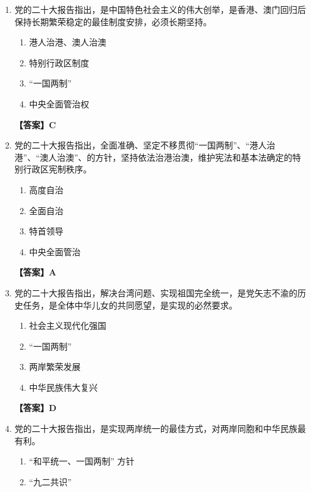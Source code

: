 \documentclass[UTF8,11pt,a4paper]{ctexart}
\begin{document}
\begin{enumerate}[label=\textbf{\arabic*.}, leftmargin=2.5em, itemsep=0.7em]
\begin{enumerate}[label=\Alph*., leftmargin=2em, itemsep=0.1em, topsep=0.15em]
\item 人民军队的组织体系
\end{enumerate}
\textbf{【答案】B}
\item 党的二十大报告指出，\allowbreak\underline{\hspace{4em}}是中国特色社会主义的伟大创举，是香港、澳门回归后保持长期繁荣稳定的最佳制度安排，必须长期坚持。
\begin{enumerate}[label=\Alph*., leftmargin=2em, itemsep=0.1em, topsep=0.15em]
\item 港人治港、澳人治澳
\item 特别行政区制度
\item “一国两制”
\item 中央全面管治权
\end{enumerate}
\textbf{【答案】C}
\item 党的二十大报告指出，全面准确、坚定不移贯彻“一国两制”、“港人治港”、“澳人治澳”、\allowbreak\underline{\hspace{4em}}的方针，坚持依法治港治澳，维护宪法和基本法确定的特别行政区宪制秩序。
\begin{enumerate}[label=\Alph*., leftmargin=2em, itemsep=0.1em, topsep=0.15em]
\item 高度自治
\item 全面自治
\item 特首领导
\item 中央全面管治
\end{enumerate}
\textbf{【答案】A}
\item 党的二十大报告指出，解决台湾问题、实现祖国完全统一，是党矢志不渝的历史任务，是全体中华儿女的共同愿望，是实现\allowbreak\underline{\hspace{4em}}的必然要求。
\begin{enumerate}[label=\Alph*., leftmargin=2em, itemsep=0.1em, topsep=0.15em]
\item 社会主义现代化强国
\item “一国两制”
\item 两岸繁荣发展
\item 中华民族伟大复兴
\end{enumerate}
\textbf{【答案】D}
\item 党的二十大报告指出，\allowbreak\underline{\hspace{4em}}是实现两岸统一的最佳方式，对两岸同胞和中华民族最有利。
\begin{enumerate}[label=\Alph*., leftmargin=2em, itemsep=0.1em, topsep=0.15em]
\item “和平统一、一国两制” 方针
\item “九二共识”

\end{enumerate}
\end{enumerate}
\end{document}
